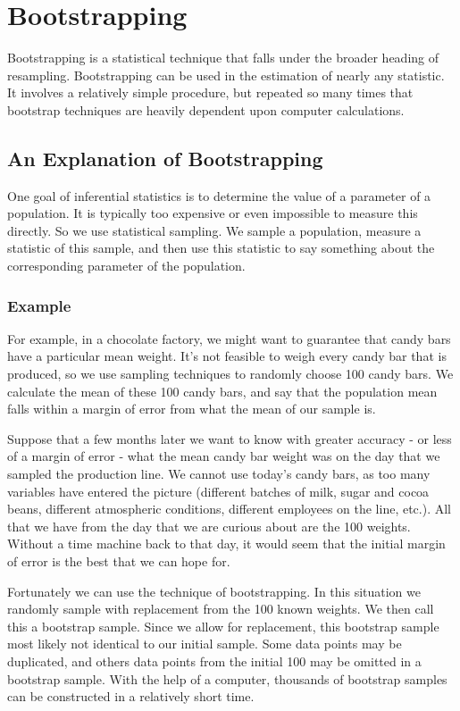 \documentclass[12pt]{article}
\begin{document}
\section*{Bootstrapping}

Bootstrapping is a statistical technique that falls under the broader heading of resampling. Bootstrapping can be used in the estimation of nearly any statistic. It involves a relatively simple procedure, but repeated so many times that bootstrap techniques are heavily dependent upon computer calculations.

\subsection*{An Explanation of Bootstrapping}

One goal of inferential statistics is to determine the value of a parameter of a population. It is typically too expensive or even impossible to measure this directly. So we use statistical sampling. We sample a population, measure a statistic of this sample, and then use this statistic to say something about the corresponding parameter of the population.

\subsubsection*{Example}
For example, in a chocolate factory, we might want to guarantee that candy bars have a particular mean weight. It’s not feasible to weigh every candy bar that is produced, so we use sampling techniques to randomly choose 100 candy bars. We calculate the mean of these 100 candy bars, and say that the population mean falls within a margin of error from what the mean of our sample is.

Suppose that a few months later we want to know with greater accuracy - or less of a margin of error - what the mean candy bar weight was on the day that we sampled the production line. We cannot use today’s candy bars, as too many variables have entered the picture (different batches of milk, sugar and cocoa beans, different atmospheric conditions, different employees on the line, etc.). All that we have from the day that we are curious about are the 100 weights. Without a time machine back to that day, it would seem that the initial margin of error is the best that we can hope for.

Fortunately we can use the technique of bootstrapping. In this situation we randomly sample with replacement from the 100 known weights. We then call this a bootstrap sample. Since we allow for replacement, this bootstrap sample most likely not identical to our initial sample. Some data points may be duplicated, and others data points from the initial 100 may be omitted in a bootstrap sample. With the help of a computer, thousands of bootstrap samples can be constructed in a relatively short time.
\end{document}
